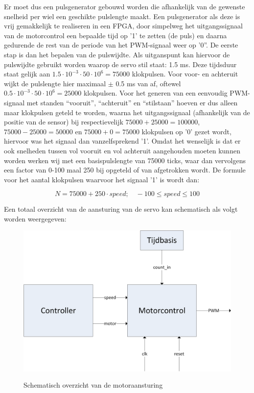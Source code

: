 \documentclass{report}
\begin{document}
Er moet dus een pulsgenerator gebouwd worden die afhankelijk van de gewenste snelheid per wiel een geschikte pulslengte maakt. Een pulsgenerator als deze is vrij gemakkelijk te realiseren in een FPGA, door simpelweg het uitgangssignaal van de motorcontrol een bepaalde tijd op '1' te zetten (de puls) en daarna gedurende de rest van de periode van het PWM-signaal weer op '0''. De eerste stap is dan het bepalen van de pulswijdte. Als uitganspunt kan hiervoor de pulswijdte gebruikt worden waarop de servo stil staat: 1.5 ms. Deze tijdsduur staat gelijk aan $1.5 \cdot 10^{-3} \cdot 50 \cdot 10^{6} = 75000$ klokpulsen. Voor voor- en achteruit wijkt de pulslengte hier maximaal $\pm$ 0.5 ms van af, oftewel $0.5 \cdot 10^{-3} \cdot 50 \cdot 10^{6} = 25000$ klokpulsen. Voor het generen van een eenvoudig PWM-signaal met standen ``vooruit'', ``achteruit'' en ``stilstaan'' hoeven er dus alleen maar klokpulsen geteld te worden, waarna het uitgangssignaal (afhankelijk van de positie van de sensor) bij respectievelijk $75000 + 25000 = 100000$, $75000 - 25000 = 50000$ en $75000 + 0 = 75000$ klokpulsen op '0' gezet wordt, hiervoor was het signaal dan vanzelfsprekend '1'.
Omdat het wenselijk is dat er ook snelheden tussen vol vooruit en vol achteruit aangehouden moeten kunnen worden werken wij met een basispulslengte van 75000 ticks, waar dan vervolgens een factor van 0-100 maal 250 bij opgeteld of van afgetrokken wordt. De formule voor het aantal klokpulsen waarvoor het signaal '1' is wordt dan:

\begin{equation}
	\label{eq:pulsewidth}
	N = 75000 + 250 \cdot speed;\quad -100 \leq speed \leq 100
\end{equation}

Een totaal overzicht van de aansturing van de servo kan schematisch als volgt worden weergegeven:

\begin{figure}[H]
	\includegraphics[width=\textwidth]{resource/motor-control}
	\label{fig:motorcontrol}
	\caption{Schematisch overzicht van de motoraansturing}
\end{figure}
\end{document}
